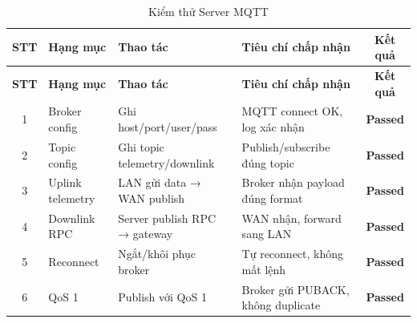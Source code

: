         \begin{longtable}{|c|p{3cm}|p{4cm}|p{5cm}|c|}
            \caption{Kiểm thử Server MQTT}
            \label{tab:test_mqtt} \\
            \hline
            \textbf{STT} & \textbf{Hạng mục} & \textbf{Thao tác} & \textbf{Tiêu chí chấp nhận} & \textbf{Kết quả} \\ \hline
            \endfirsthead
        
            \hline
            \textbf{STT} & \textbf{Hạng mục} & \textbf{Thao tác} & \textbf{Tiêu chí chấp nhận} & \textbf{Kết quả} \\ \hline
            \endhead
        
            \hline
            \endfoot
            \endlastfoot
        
            1 & Broker config & Ghi host/port/user/pass & MQTT connect OK, log xác nhận & \textcolor{modern_blue}{\textbf{Passed}} \\ \hline
            2 & Topic config & Ghi topic telemetry/downlink & Publish/subscribe đúng topic & \textcolor{modern_blue}{\textbf{Passed}} \\ \hline
            3 & Uplink telemetry & LAN gửi data → WAN publish & Broker nhận payload đúng format & \textcolor{modern_blue}{\textbf{Passed}} \\ \hline
            4 & Downlink RPC & Server publish RPC → gateway & WAN nhận, forward sang LAN & \textcolor{modern_blue}{\textbf{Passed}} \\ \hline
            5 & Reconnect & Ngắt/khôi phục broker & Tự reconnect, không mất lệnh & \textcolor{modern_blue}{\textbf{Passed}} \\ \hline
            6 & QoS 1 & Publish với QoS 1 & Broker gửi PUBACK, không duplicate & \textcolor{modern_blue}{\textbf{Passed}} \\ \hline
        \end{longtable}
        
